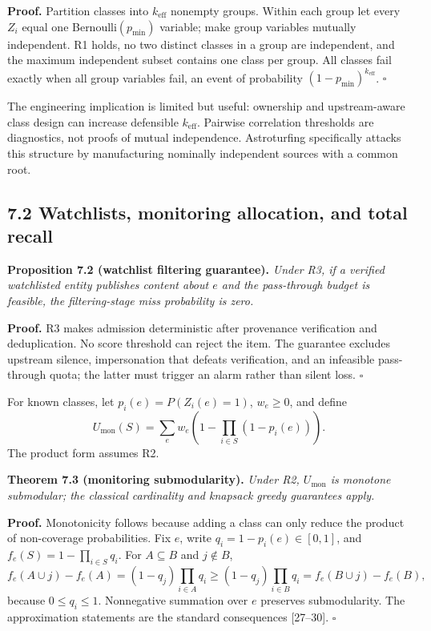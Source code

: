 \documentclass[
  11pt]{article}
\begin{document}
\textbf{Proof.} Partition classes into \(k_{\mathrm{eff}}\) nonempty groups. Within each group let every \(Z_i\) equal one Bernoulli\((p_{\min})\) variable; make group variables mutually independent. R1 holds, no two distinct classes in a group are independent, and the maximum independent subset contains one class per group. All classes fail exactly when all group variables fail, an event of probability \((1-p_{\min})^{k_{\mathrm{eff}}}\). \(\square\)

The engineering implication is limited but useful: ownership and upstream-aware class design can increase defensible \(k_{\mathrm{eff}}\). Pairwise correlation thresholds are diagnostics, not proofs of mutual independence. Astroturfing specifically attacks this structure by manufacturing nominally independent sources with a common root.

\subsection{7.2 Watchlists, monitoring allocation, and total recall}\label{watchlists-monitoring-allocation-and-total-recall}

\textbf{Proposition 7.2 (watchlist filtering guarantee).} \emph{Under R3, if a verified watchlisted entity publishes content about \(e\) and the pass-through budget is feasible, the filtering-stage miss probability is zero.}

\textbf{Proof.} R3 makes admission deterministic after provenance verification and deduplication. No score threshold can reject the item. The guarantee excludes upstream silence, impersonation that defeats verification, and an infeasible pass-through quota; the latter must trigger an alarm rather than silent loss. \(\square\)

For known classes, let \(p_i(e)=P(Z_i(e)=1)\), \(w_e\geq0\), and define \[
U_{\mathrm{mon}}(S)=\sum_ew_e\left(1-\prod_{i\in S}(1-p_i(e))\right).
\tag{15}
\] The product form assumes R2.

\textbf{Theorem 7.3 (monitoring submodularity).} \emph{Under R2, \(U_{\mathrm{mon}}\) is monotone submodular; the classical cardinality and knapsack greedy guarantees apply.}

\textbf{Proof.} Monotonicity follows because adding a class can only reduce the product of non-coverage probabilities. Fix \(e\), write \(q_i=1-p_i(e)\in[0,1]\), and \(f_e(S)=1-\prod_{i\in S}q_i\). For \(A\subseteq B\) and \(j\notin B\), \[
f_e(A\cup j)-f_e(A)=(1-q_j)\prod_{i\in A}q_i
\geq(1-q_j)\prod_{i\in B}q_i
=f_e(B\cup j)-f_e(B),
\] because \(0\leq q_i\leq1\). Nonnegative summation over \(e\) preserves submodularity. The approximation statements are the standard consequences {[}27--30{]}. \(\square\)
\end{document}
